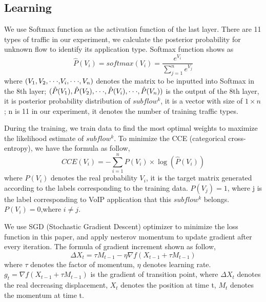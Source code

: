 \documentclass[conference]{IEEEtran}
\begin{document}
\subsection{Learning}
We use Softmax function as the activation function of the last layer. There are 11 types of traffic in our experiment, we calculate the posterior probability for unknown flow to identify its application type. Softmax function shows as
\begin{equation}
\hat P({V_i}) = softmax({V_i}) = \frac{{{e^{{V_i}}}}}{{\sum\limits_{j = 1}^n {{e^{{V_j}}}} }}
\end{equation}
where $({V_1},{V_2},{\rm{\cdot\cdot\cdot,}}{V_i},{\rm{\cdot\cdot\cdot}},{V_n})$ denotes the matrix to be inputted into Softmax in the 8th layer; $(\hat P({V_1}),\hat P({V_2}),{\rm{\cdot\cdot\cdot}},\hat P({V_i}),{\rm{\cdot\cdot\cdot}},\hat P({V_n}))$ is the output of the 8th layer, it is posterior probability distribution of $subflow^k$, it is a vector with size of $1 \times n$; n is 11 in our experiment, it denotes the number of training traffic types.

During the training, we train data to find the most optimal weights to maximize the likelihood estimate of $subflow^k$. To minimize the CCE (categorical cross-entropy), we have the formula as follow,
\begin{equation}
CCE({V_i}) =  - \sum\limits_{i = 1}^n {P({V_i}) \times \log (\hat P({V_i}))}
\end{equation}
where $P({V_i})$ denotes the real probability ${V_i}$, it is the target matrix generated according to the labels corresponding to the training data. $P({V_j})=1$, where j is the label corresponding to VoIP application that this $subflow^k$ belongs.$P({V_i})=0$,where $i \ne j$.

We use SGD (Stochastic Gradient Descent) optimizer to minimize the loss function in this paper, and apply nesterov momentum to update gradient after every iteration. The formula of gradient increment shown as follow,
\begin{equation}
\Delta {X_t} = \tau {M_{t - 1}} - \eta \nabla f({X_{t - 1}} + \tau {M_{t - 1}})
\end{equation}
where ${\tau}$ denotes the factor of momentum, ${\eta}$ denotes learning rate. ${g_t} = \nabla f({X_{t - 1}} + \tau {M_{t - 1}})$ is the gradient of transition point, where $\Delta {X_t}$ denotes the real decreasing displacement, ${X_t}$ denotes the position at time t, ${M_t}$ denotes the momentum at time t.
\end{document}
